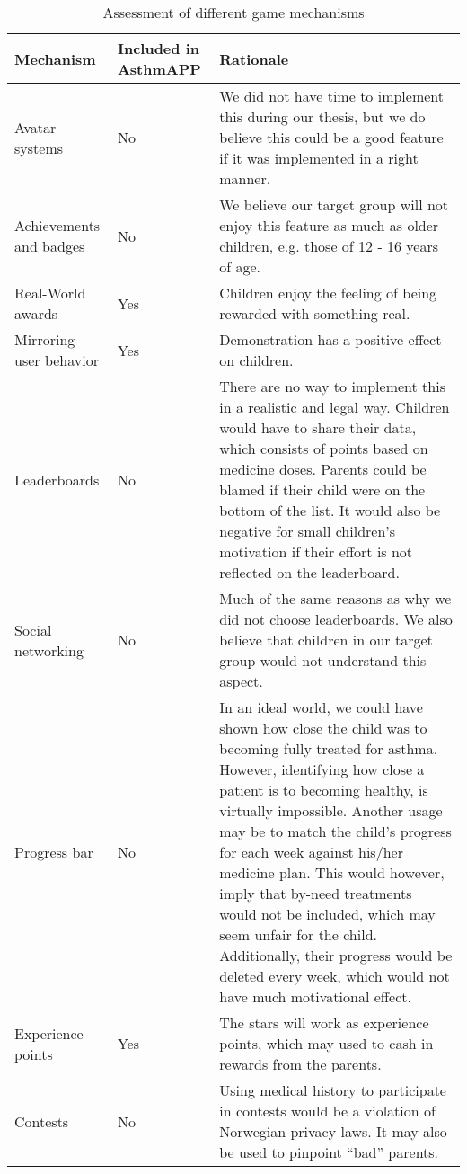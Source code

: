 \begin{onehalfspacing}
\begin{table}[H]
\begin{tabular}{| p{2.5cm} | p{2.1cm} | p{9.5cm} | }
	\hline
	\textbf{Mechanism} & \textbf{Included in AsthmAPP} & \textbf{Rationale} \\
	\hline
	Avatar systems & No & We did not have time to implement this during our thesis, but we do believe this could be a good feature if it was implemented in a right manner.    
	 \\
	\hline
	Achievements and badges & No & We believe our target group will not enjoy this feature as much as older children, e.g. those of 12 - 16 years of age.  \\
	\hline 
	Real-World awards & Yes & Children enjoy the feeling of being rewarded with something real.
	 \\
	\hline
	Mirroring user behavior & Yes & Demonstration has a positive effect on children.
	\\
	\hline
	Leaderboards & No & There are no way to implement this in a realistic and legal way. Children would have to share their data, which consists of points based on medicine doses. Parents could be blamed if their child were on the bottom of the list. It would also be negative for small children's motivation if their effort is not reflected on the leaderboard. 
	\\
	\hline
	Social networking & No & Much of the same reasons as why we did not choose leaderboards. We also believe that children in our target group would not understand this aspect.  
	\\
	\hline
	Progress bar & No & In an ideal world, we could have shown how close the child was to becoming fully treated for asthma. However, identifying how close a patient is to becoming healthy, is virtually impossible. Another usage may be to match the child's progress for each week against his/her medicine plan. This would however, imply that by-need treatments would not be included, which may seem unfair for the child. Additionally, their progress would be deleted every week, which would not have much motivational effect.  
	\\
	\hline
	Experience points & Yes & The stars will work as experience points, which may used to cash in rewards from the parents. 
	\\
	\hline
	Contests & No & Using medical history to participate in contests would be a violation of Norwegian privacy laws. It may also be used to pinpoint ``bad'' parents.      
	\\
	\hline
\end{tabular}
\caption{Assessment of different game mechanisms}
\label{tab:game-mech-in-astmapp}
\end{table}
\end{onehalfspacing}
